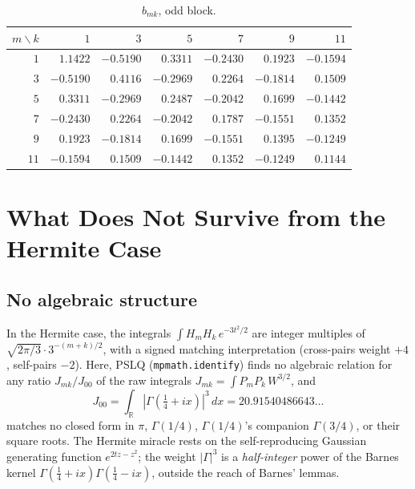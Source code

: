 \documentclass[11pt,a4paper]{article}
\theoremstyle{definition}
\theoremstyle{plain}
\newcommand{\R}{\mathbb{R}}
\begin{document}
\begin{table}[ht]
\centering
\caption{$b_{mk}$, odd block.}
\label{tab:odd}
\small
\begin{tabular}{r|rrrrrr}
\toprule
$m \backslash k$ & $1$ & $3$ & $5$ & $7$ & $9$ & $11$ \\
\midrule
$1$  & $1.1422$  & $-0.5190$ & $0.3311$  & $-0.2430$ & $0.1923$  & $-0.1594$ \\
$3$  & $-0.5190$ & $0.4116$  & $-0.2969$ & $0.2264$  & $-0.1814$ & $0.1509$  \\
$5$  & $0.3311$  & $-0.2969$ & $0.2487$  & $-0.2042$ & $0.1699$  & $-0.1442$ \\
$7$  & $-0.2430$ & $0.2264$  & $-0.2042$ & $0.1787$  & $-0.1551$ & $0.1352$  \\
$9$  & $0.1923$  & $-0.1814$ & $0.1699$  & $-0.1551$ & $0.1395$  & $-0.1249$ \\
$11$ & $-0.1594$ & $0.1509$  & $-0.1442$ & $0.1352$  & $-0.1249$ & $0.1144$  \\
\bottomrule
\end{tabular}
\end{table}

\section{What Does Not Survive from the Hermite Case}

\subsection{No algebraic structure}

In the Hermite case, the integrals $\int H_m H_k\, e^{-3t^2/2}$ are
integer multiples of $\sqrt{2\pi/3} \cdot 3^{-(m+k)/2}$, with a signed
matching interpretation (cross-pairs weight $+4$, self-pairs $-2$).
Here, PSLQ (\texttt{mpmath.identify}) finds no algebraic relation for
any ratio $J_{mk}/J_{00}$ of the raw integrals
$J_{mk} = \int P_m P_k\, W^{3/2}$, and
\[
  J_{00} = \int_\R |\Gamma(\tfrac14 + ix)|^3\, dx
         = 20.91540486643\ldots
\]
matches no closed form in $\pi$, $\Gamma(1/4)$, $\Gamma(1/4)$'s
companion $\Gamma(3/4)$, or their square roots. The Hermite miracle
rests on the self-reproducing Gaussian generating function
$e^{2tz - z^2}$; the weight $|\Gamma|^3$ is a \emph{half-integer} power
of the Barnes kernel $\Gamma(\tfrac14+ix)\Gamma(\tfrac14-ix)$, outside
the reach of Barnes' lemmas.
\end{document}
